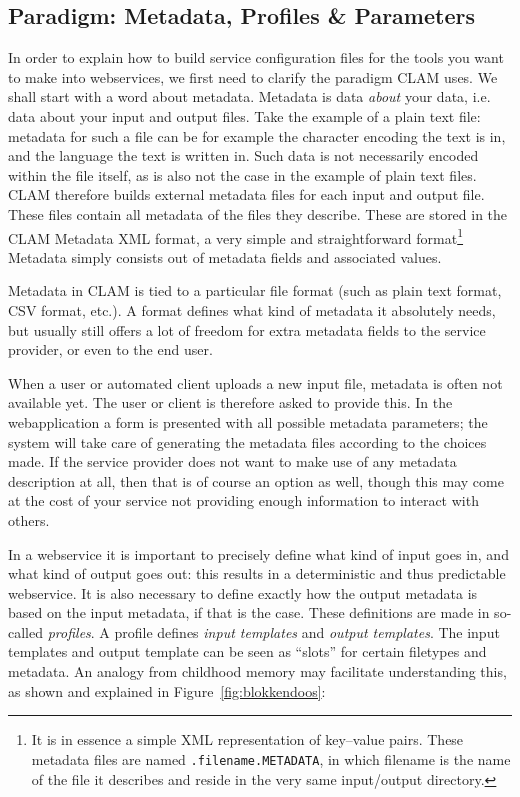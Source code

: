 \documentclass[a4paper,12pt]{report}
\begin{document}
\subsection{Paradigm: Metadata, Profiles \& Parameters}

In order to explain how to build service configuration files for the tools you
want to make into webservices, we first need to clarify the paradigm CLAM uses.
We shall start with a word about metadata. Metadata is data \emph{about}\/ your
data, i.e. data about your input and output files. Take the example of a plain
text file: metadata for such a file can be for example the character encoding
the text is in, and the language the text is written in. Such data is not
necessarily encoded within the file itself, as is also not the case in the
example of plain text files. CLAM therefore builds external metadata files for
each input and output file. These files contain all metadata of the files they
describe. These are stored in the CLAM Metadata XML format, a very simple and
straightforward format\footnote{It is in essence a simple XML representation of
key--value pairs. These metadata files are named \texttt{.filename.METADATA},
in which filename is the name of the file it describes and reside in the very
same input/output directory.} Metadata simply consists out of metadata fields
and associated values.

Metadata in CLAM is tied to a particular file format (such as plain text
format, CSV format, etc.). A format defines what kind of metadata it absolutely
needs, but usually still offers a lot of freedom for extra metadata fields to
the service provider, or even to the end user. 

When a user or automated client uploads a new input file, metadata is often not
available yet. The user or client is therefore asked to provide this. In the
webapplication a form is presented with all possible metadata parameters; the
system will take care of generating the metadata files according to the choices
made. If the service provider does not want to make use of any metadata
description at all, then that is of course an option as well, though this may
come at the cost of your service not providing enough information to interact
with others.

In a webservice it is important to precisely define what kind of input goes in,
and what kind of output goes out: this results in a deterministic and thus
predictable webservice. It is also necessary to define exactly how the output
metadata is based on the input metadata, if that is the case. These definitions
are made in so-called \emph{profiles}. A profile defines \emph{input templates}
and \emph{output templates}. The input templates and output template can be
seen as ``slots'' for certain filetypes and metadata. An analogy from childhood
memory may facilitate understanding this, as shown and explained in
Figure~\ref{fig:blokkendoos}:
\end{document}
